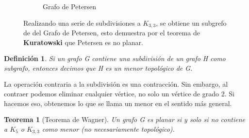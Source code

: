 \documentclass[a4paper,1pt]{report}
\newtheorem*{teo}{Teorema}
\newtheorem*{dfn}{Definición}
\begin{document}
\begin{figure}[H]
\begin{subfigure}[b]{0.45\textwidth}
    \caption{Grafo de Petersen}
    \end{subfigure}
    \caption{Realizando una serie de subdivisiones a $K_{3,3}$, se obtiene un subgrefo de del Grafo de Petersen, esto demuestra por el teorema de \textbf{Kuratowski} que Petersen es no planar.}
\end{figure} 


\begin{dfn} 
Si un grafo G contiene una subdivisión de un grafo H como subgrafo, entonces decimos que H es un menor topológico de G. 
\end{dfn}

La operación contraria a la subdivisión es una contracción. Sin embargo, al contraer podemos eliminar cualquier vértice, no
solo un vértice de grado 2. Si hacemos eso, obtenemos lo que se llama un menor en el sentido más general.

\begin{teo}[Teorema de Wagner]
 Un grafo G es planar si y solo si no contiene a $K_5$ o  $K_{3,3}$  como menor (no necesariamente topológico). 
\end{teo}
\end{document}
